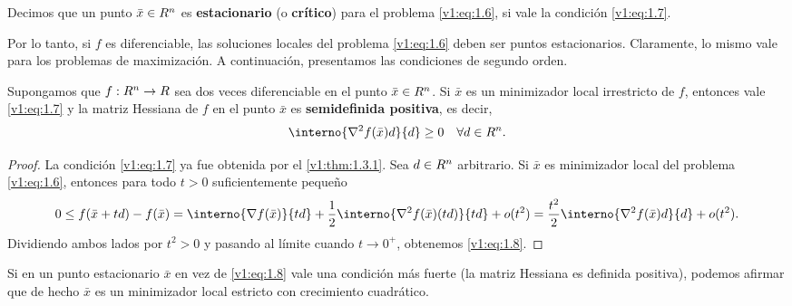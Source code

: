 \begin{definition}\label{v1:def:1.3.1}
 Decimos que un punto $\bar{x} \in R^n$ es \textbf{estacionario} (o \textbf{crítico}) para el problema \eqref{v1:eq:1.6}, si vale la condición \eqref{v1:eq:1.7}.
\end{definition}

Por lo tanto, si $f$ es diferenciable, las soluciones locales del problema \eqref{v1:eq:1.6} deben ser puntos estacionarios. Claramente, lo mismo vale para los problemas de maximización. A continuación, presentamos las condiciones de segundo orden.

\begin{theorem}\label{v1:thm:1.3.2}
 Supongamos que $f : R^n \to R$ sea dos veces diferenciable en el punto $\bar{x} \in R^n$.
 Si $\bar{x}$ es un minimizador local irrestricto de $f$, entonces vale \eqref{v1:eq:1.7} y la matriz Hessiana de $f$ en el punto $\bar{x}$ es \textbf{semidefinida positiva}, es decir,
 \begin{equation}
 \interno{\nabla^2 f(\bar{x})d}{d} \ge 0 \quad \forall d \in \Rn. \label{v1:eq:1.8}
 \end{equation}
\end{theorem}

\begin{proof}
 La condición \eqref{v1:eq:1.7} ya fue obtenida por el \cref{v1:thm:1.3.1}. Sea $d \in R^n$ arbitrario. Si $\bar{x}$ es minimizador local del problema \eqref{v1:eq:1.6}, entonces para todo $t > 0$ suficientemente pequeño
 \[
 0 \le f(\bar{x} + td) - f(\bar{x})
 = \interno{\nabla f(\bar{x})}{td} + \frac{1}{2}\interno{\nabla^2 f(\bar{x})(td)}{td} + o(t^2)
 = \frac{t^2}{2}\interno{\nabla^2 f(\bar{x})d}{d} + o(t^2).
 \]
 Dividiendo ambos lados por $t^2 > 0$ y pasando al límite cuando $t \to 0^+$, obtenemos \eqref{v1:eq:1.8}.
\end{proof}

Si en un punto estacionario $\bar{x}$ en vez de \eqref{v1:eq:1.8} vale una condición más fuerte (la matriz Hessiana es definida positiva), podemos afirmar que de hecho $\bar{x}$ es un minimizador local estricto con crecimiento cuadrático.

